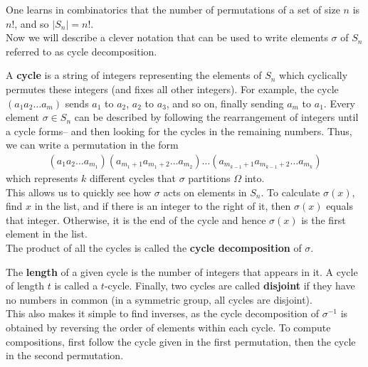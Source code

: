 \documentclass{memoir}
\begin{document}
One learns in combinatorics that the number of permutations of a set of size \(n\) is \(n!\), and so \(\left| S_n \right| = n!\).\\

Now we will describe a clever notation that can be used to write elements \(\sigma \) of \(S_n\) referred to as cycle decomposition.

\begin{defn}
	A \textbf{cycle} is a string of integers representing the elements of \(S_n\) which cyclically permutes these integers (and fixes all other integers). For example, the cycle \((a_1a_2\ldots a_m)\) sends \(a_1\) to \(a_2\), \(a_2\) to \(a_3\), and so on, finally sending \(a_m\) to \(a_1\). Every element \(\sigma \in S_n\) can be described by following the rearrangement of integers until a cycle forms-- and then looking for the cycles in the remaining numbers. Thus, we can write a permutation in the form
	\begin{align*}
		(a_1a_2\ldots a_{m_1}) (a_{m_1+1}a_{m_1+2}\ldots a_{m_2})\ldots(a_{m_{k-1}+1}a_{m_{k-1}+2}\ldots a_{m_k})
	\end{align*}
	which represents \(k\) different cycles that \(\sigma \) partitions \(\Omega \) into.\\

This allows us to quickly see how \(\sigma \) acts on elements in \(S_n\). To calculate \(\sigma (x)\), find \(x\) in the list, and if there is an integer to the right of it, then \(\sigma (x)\) equals that integer. Otherwise, it is the end of the cycle and hence \(\sigma (x)\) is the first element in the list.\\

The product of all the cycles is called the \textbf{cycle decomposition} of \(\sigma \).
\end{defn}
The \textbf{length} of a given cycle is the number of integers that appears in it. A cycle of length \(t\) is called a \(t\)-cycle. Finally, two cycles are called \textbf{disjoint} if they have no numbers in common (in a symmetric group, all cycles are disjoint).\\

This also makes it simple to find inverses, as the cycle decomposition of \(\sigma ^{-1}\) is obtained by reversing the order of elements within each cycle. To compute compositions, first follow the cycle given in the first permutation, then the cycle in the second permutation.\\
\end{document}
